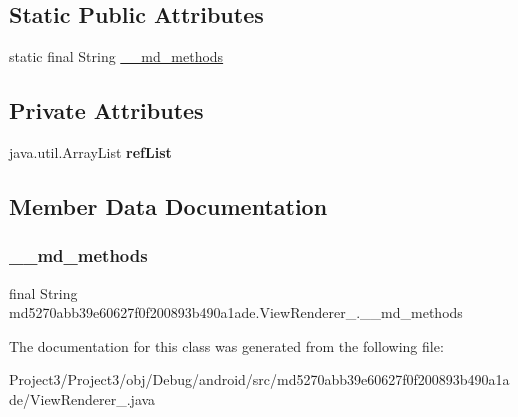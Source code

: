 \subsection*{Static Public Attributes}
\begin{DoxyCompactItemize}
\item 
static final String \hyperlink{classmd5270abb39e60627f0f200893b490a1ade_1_1ViewRenderer__2_ac66b6f41d2afba0df6ae890c8f2b644b}{\+\_\+\+\_\+md\+\_\+methods}
\end{DoxyCompactItemize}
\subsection*{Private Attributes}
\begin{DoxyCompactItemize}
\item 
\mbox{\label{classmd5270abb39e60627f0f200893b490a1ade_1_1ViewRenderer__2_a489e61f24650a22849fddacb3f498a6b}} 
java.\+util.\+Array\+List {\bfseries ref\+List}
\end{DoxyCompactItemize}


\subsection{Member Data Documentation}
\mbox{\label{classmd5270abb39e60627f0f200893b490a1ade_1_1ViewRenderer__2_ac66b6f41d2afba0df6ae890c8f2b644b}} 
\subsubsection{\texorpdfstring{\+\_\+\+\_\+md\+\_\+methods}{\_\_md\_methods}}
{\footnotesize\ttfamily final String md5270abb39e60627f0f200893b490a1ade.\+View\+Renderer\+\_.\+\_\+\+\_\+md\+\_\+methods\hspace{0.3cm}{\ttfamily [static]}}



The documentation for this class was generated from the following file\+:\begin{DoxyCompactItemize}
\item 
Project3/\+Project3/obj/\+Debug/android/src/md5270abb39e60627f0f200893b490a1ade/View\+Renderer\+\_.\+java\end{DoxyCompactItemize}
